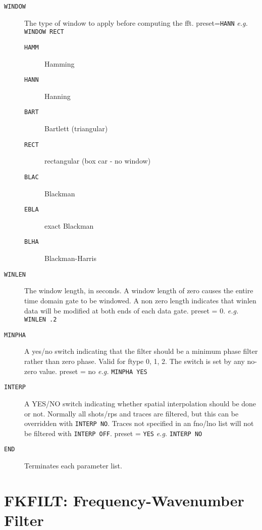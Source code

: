 \begin{description}
\item[\texttt{WINDOW}] The type of window to apply before computing the \gls{fft}.
    \Gls{preset}=\texttt{HANN}  \textit{e.g.} \texttt{WINDOW RECT}
\begin{description}
       \item[\texttt{HAMM}] Hamming
       \item[\texttt{HANN}] Hanning
       \item[\texttt{BART}] Bartlett (triangular)
       \item[\texttt{RECT}] rectangular (box car - no window)
       \item[\texttt{BLAC}] Blackman
       \item[\texttt{EBLA}] exact Blackman
       \item[\texttt{BLHA}] Blackman-Harris
\end{description}

\item[\texttt{WINLEN}] The window length, in seconds.  A window length of zero causes
         the entire time domain gate to be windowed.  A non zero length
         indicates that winlen data will be modified at both ends of each
         data gate.
         \Gls{preset} = 0.  \textit{e.g.}  \texttt{WINLEN .2}

\item[\texttt{MINPHA}] A yes/no switch indicating that the filter should be a minimum
         phase filter rather than zero phase.  Valid for ftype 0, 1, 2.
         The switch is set by any no-zero value.
         \Gls{preset} = no     \textit{e.g.} \texttt{MINPHA YES}

\item[\texttt{INTERP}] A YES/NO switch indicating whether spatial interpolation should
         be done or not.  Normally all \glspl{shot}/\glspl{rp} and traces are filtered,
         but this can be overridden with \texttt{INTERP NO}.  Traces not specified
         in an fno/lno list will not be filtered with \texttt{INTERP OFF}.
         \Gls{preset} = \texttt{YES}    \textit{e.g.}   \texttt{INTERP NO}

\item[\texttt{END}] Terminates each parameter list.
\end{description}

\section{FKFILT: Frequency-Wavenumber Filter}
\label{cmd_fkfilt}

